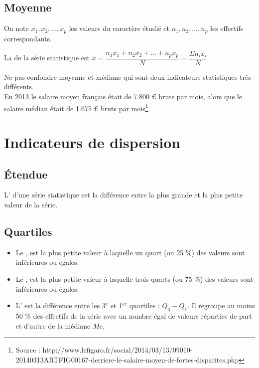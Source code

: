 \documentclass[12pt,a4paper]{article}
\begin{document}


\subsection{Moyenne}

\begin{mydef}
	On note $x_1, x_2, ..., x_p$ les valeurs du caractère étudié et $n_1, n_2, ...,n_p$ les effectifs correspondants.
	
	La  de la série statistique est $\bar{x} = \dfrac{n_1x_1 + n_2x_2 + ... + n_px_p}{N} = \dfrac{\Sigma n_ix_i}{N} $
	
\end{mydef}



\begin{mywarning}
	Ne pas confondre moyenne et médiane qui sont deux indicateurs statistiques très différents.\\
	
	
	En 2013 le salaire moyen français était de 7.800 € bruts par mois, alors que le salaire médian était de 1.675 € bruts par mois\footnote{Source : http://www.lefigaro.fr/social/2014/03/13/09010-20140313ARTFIG00167-derriere-le-salaire-moyen-de-fortes-disparites.php}.
\end{mywarning}

\section{Indicateurs de dispersion}

\subsection{\'Etendue}
	
	\begin{mydef}
		L' d'une série statistique est la différence entre la plus grande et la plus petite valeur de la série.
	\end{mydef}	

	

\subsection{Quartiles}

\begin{mydef}
	\begin{itemize}
		\item Le , est la plus petite valeur à laquelle un quart (ou 25 \%) des valeurs sont inférieures ou égales.
		\item Le , est la plus petite valeur à laquelle trois quarts (ou 75 \%) des valeurs sont inférieures ou égales.
		\item L' est la différence entre les 3$^e$ et 1$^{er}$ quartiles : $Q_3 - Q_1$. Il regroupe au moins 50 \% des effectifs de la série avec un nombre égal de valeurs réparties de part et d'autre de la médiane $Me$.
	\end{itemize}
	 
\end{mydef}	
\end{document}
